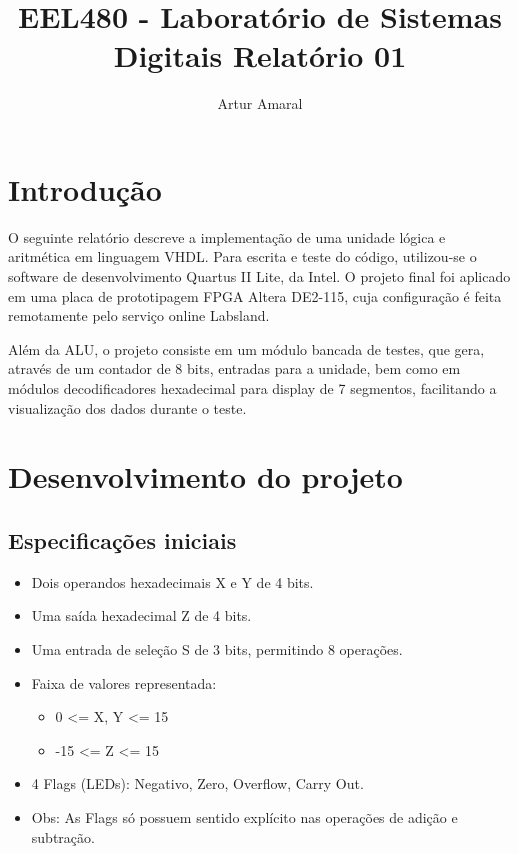 \documentclass{article}
\author{Artur Amaral}
\title{EEL480 - Laboratório de Sistemas Digitais Relatório 01}
\begin{document}
\maketitle

\section{Introdução}

    O seguinte relatório descreve a implementação de uma unidade lógica e aritmética
em linguagem VHDL. Para escrita e teste do código, utilizou-se o software de
desenvolvimento Quartus II Lite, da Intel. O projeto final foi aplicado em uma
placa de prototipagem FPGA Altera DE2-115, cuja configuração é feita
remotamente pelo serviço online Labsland.

Além da ALU, o projeto consiste em um módulo bancada de testes, que gera,
através de um contador de 8 bits, entradas para a unidade, bem como em módulos
decodificadores hexadecimal para display de 7 segmentos, facilitando a visualização
dos dados durante o teste.

\section{Desenvolvimento do projeto}

\subsection{Especificações iniciais}

\begin{itemize}
    \item Dois operandos hexadecimais  X e Y de 4 bits.
    \item Uma saída hexadecimal Z de 4 bits.
    \item Uma entrada de seleção S de 3 bits, permitindo 8 operações.
    \item Faixa de valores representada:
        \begin{itemize}
            \item  0 <= X, Y <= 15
            \item  -15 <= Z <= 15
        \end{itemize}
    \item 4 Flags (LEDs): Negativo, Zero, Overflow, Carry Out.
    \item Obs: As Flags só possuem sentido explícito nas operações de adição e subtração.
\end{itemize}
\end{document}

